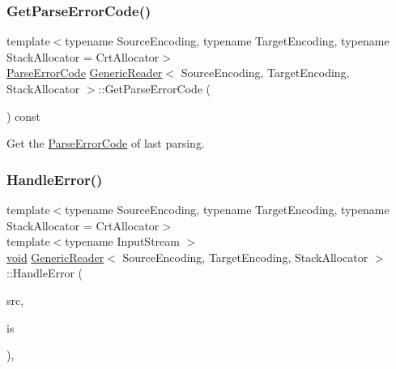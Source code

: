 \mbox{\label{classGenericReader_a937bf90919f50e1c370b312cee5833e8}} 
\subsubsection{\texorpdfstring{Get\+Parse\+Error\+Code()}{GetParseErrorCode()}}
{\footnotesize\ttfamily template$<$typename Source\+Encoding, typename Target\+Encoding, typename Stack\+Allocator = Crt\+Allocator$>$ \\
\hyperlink{group__RAPIDJSON__ERRORS_ga8d4b32dfc45840bca189ade2bbcb6ba7}{Parse\+Error\+Code} \hyperlink{classGenericReader}{Generic\+Reader}$<$ Source\+Encoding, Target\+Encoding, Stack\+Allocator $>$\+::Get\+Parse\+Error\+Code (\begin{DoxyParamCaption}{ }\end{DoxyParamCaption}) const\hspace{0.3cm}{\ttfamily [inline]}}



Get the \hyperlink{group__RAPIDJSON__ERRORS_ga8d4b32dfc45840bca189ade2bbcb6ba7}{Parse\+Error\+Code} of last parsing. 

\mbox{\label{classGenericReader_a46660019ff1ed42bc192d9b5f9119b0f}} 
\subsubsection{\texorpdfstring{Handle\+Error()}{HandleError()}}
{\footnotesize\ttfamily template$<$typename Source\+Encoding, typename Target\+Encoding, typename Stack\+Allocator = Crt\+Allocator$>$ \\
template$<$typename Input\+Stream $>$ \\
\hyperlink{imgui__impl__opengl3__loader_8h_ac668e7cffd9e2e9cfee428b9b2f34fa7}{void} \hyperlink{classGenericReader}{Generic\+Reader}$<$ Source\+Encoding, Target\+Encoding, Stack\+Allocator $>$\+::Handle\+Error (\begin{DoxyParamCaption}\item[{\hyperlink{classGenericReader_a269700a68b925db2f3ecc84b75f2277e}{Iterative\+Parsing\+State}}]{src,  }\item[{Input\+Stream \&}]{is }\end{DoxyParamCaption})\hspace{0.3cm}{\ttfamily [inline]}, {\ttfamily [private]}}

